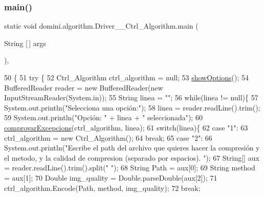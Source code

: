 \subsubsection{\texorpdfstring{main()}{main()}}
{\footnotesize\ttfamily static void domini.\+algorithm.\+Driver\+\_\+\+\_\+\+Ctrl\+\_\+\+Algorithm.\+main (\begin{DoxyParamCaption}\item[{String \mbox{[}$\,$\mbox{]}}]{args }\end{DoxyParamCaption})\hspace{0.3cm}{\ttfamily [inline]}, {\ttfamily [static]}}


\begin{DoxyCode}
50                                            \{
51     \textcolor{keywordflow}{try} \{
52         Ctrl\_Algorithm ctrl\_algorithm = null;
53         \hyperlink{classdomini_1_1algorithm_1_1Driver____Ctrl__Algorithm_afad303731ad32c08c8dbffbf63b3fd9f}{showOptions}();
54         BufferedReader reader = \textcolor{keyword}{new} BufferedReader(\textcolor{keyword}{new} InputStreamReader(System.in));
55         String linea = \textcolor{stringliteral}{""};
56         \textcolor{keywordflow}{while}(linea != null)\{
57             System.out.println(\textcolor{stringliteral}{"Selecciona una opción:"});
58             linea = reader.readLine().trim();
59             System.out.println(\textcolor{stringliteral}{"Opción: "} + linea + \textcolor{stringliteral}{" seleccionada"});
60             \hyperlink{classdomini_1_1algorithm_1_1Driver____Ctrl__Algorithm_a38ad7761ecde80325d83ce2d2597a61b}{comprovarExcepcions}(ctrl\_algorithm, linea);
61             \textcolor{keywordflow}{switch}(linea)\{
62                 \textcolor{keywordflow}{case} \textcolor{stringliteral}{"1"}:
63                     ctrl\_algorithm = \textcolor{keyword}{new} Ctrl\_Algorithm();
64                 \textcolor{keywordflow}{break};
65                 \textcolor{keywordflow}{case} \textcolor{stringliteral}{"2"}:
66                     System.out.println(\textcolor{stringliteral}{"Escribe el path del archivo que quieres hacer la compresión y el
       metodo, y la calidad de compresion (separado por espacios). "});
67                     String[] aux = reader.readLine().trim().split(\textcolor{stringliteral}{" "});
68                     String Path = aux[0];
69                     String method = aux[1];
70                     Double img\_quality = Double.parseDouble(aux[2]);
71                     ctrl\_algorithm.Encode(Path, method, img\_quality);
72                 \textcolor{keywordflow}{break};

\end{DoxyCode}
